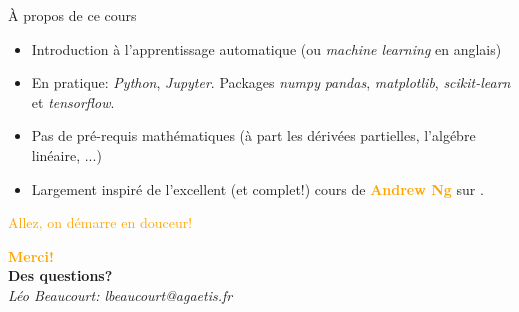 \documentclass[11pt]{beamer}
\begin{document}
\begin{frame}{À propos de ce cours}
  \begin{itemize}
  \item Introduction à l'apprentissage automatique (ou \textit{machine learning} en anglais)
  \item En pratique: \textit{Python}, \textit{Jupyter}. Packages \textit{numpy} \textit{pandas}, \textit{matplotlib}, \textit{scikit-learn} et \textit{tensorflow}.
  \item Pas de pré-requis mathématiques (à part les dérivées partielles, l'algébre linéaire, ...)
  \item Largement inspiré de l'excellent (et complet!) cours de \textbf{\textcolor{orange}{Andrew Ng}} sur \href{https://www.coursera.org/learn/machine-learning}{\color{blue}{Coursera}}. 
  \end{itemize}
  
  \vfill
  \begin{center}
    \large
    \textcolor{orange}{Allez, on démarre en douceur!}
  \end{center}
\end{frame}






\begin{frame}
  \begin{center}
    \huge
    \vspace{5cm}
    \textbf{\textcolor{orange}{Merci!}}\\
    \textbf{Des questions?}\\
    \vspace{1cm}
    \normalsize
    \textit{Léo Beaucourt: lbeaucourt@agaetis.fr}
  \end{center}
\end{frame}
\end{document}
